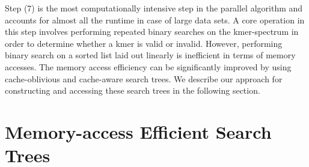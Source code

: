 \documentclass[10pt, conference]{IEEEtran}
\begin{document}
Step (7) is the most computationally intensive step in the parallel algorithm and accounts for almost all the runtime in case of large data sets. A core operation in this step involves performing repeated binary searches on the kmer-spectrum in order to determine whether a kmer is valid or invalid. However, performing binary search on a sorted list laid out linearly is inefficient in terms of memory accesses. The memory access efficiency can be significantly improved by using cache-oblivious and cache-aware search trees. We describe our approach for constructing and accessing these search trees in the following section.


\section{Memory-access Efficient Search Trees} \label{sec_Memory-access}
\end{document}
